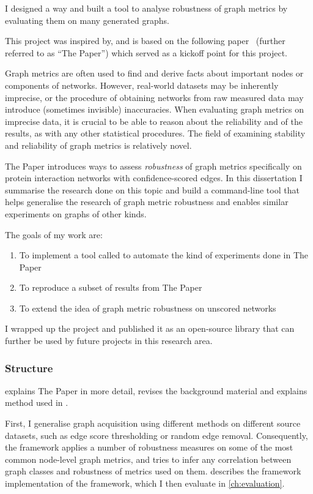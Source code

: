 I designed a way and built a tool to analyse robustness of graph metrics by evaluating them on many generated graphs.

This project was inspired by, and is based on the following paper~\cite{Bozhilova2019} (further referred to as ``The Paper'') which served as a kickoff point for this project.
\begin{adjustwidth}{1cm}{}
    \vspace*{0.5em}\vspace*{0.5em}
\end{adjustwidth}

Graph metrics are often used to find and derive facts about important nodes or components of networks.
However, real-world datasets may be inherently imprecise, or the procedure of obtaining networks from raw measured data may introduce (sometimes invisible) inaccuracies.
When evaluating graph metrics on imprecise data, it is crucial to be able to reason about the reliability and of the results, as with any other statistical procedures.
The field of examining stability and reliability of graph metrics is relatively novel.

The Paper introduces ways to assess \textsl{robustness} of graph metrics specifically on protein interaction networks with confidence-scored edges.
In this dissertation I summarise the research done on this topic and build a command-line tool that helps generalise the research of graph metric robustness and enables similar experiments on graphs of other kinds.

The goals of my work are:
\begin{enumerate}
    \item To implement a tool called \graffs to automate the kind of experiments done in The Paper
    \item To reproduce a subset of results from The Paper
    \item To extend the idea of graph metric robustness on unscored networks
\end{enumerate}

I wrapped up the project and published it as an open-source library that can further be used by future projects in this research area.

\subsubsection*{Structure}


 explains The Paper in more detail, revises the background material and explains method used in \graffs.

First, I generalise graph acquisition using different methods on different source datasets, such as edge score thresholding or random edge removal.
Consequently, the framework applies a number of robustness measures on some of the most common node-level graph metrics, and tries to infer any correlation between graph classes and robustness of metrics used on them.
 describes the framework implementation of the framework, which I then evaluate in \cref{ch:evaluation}.


